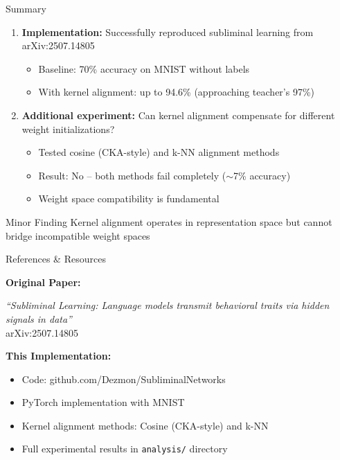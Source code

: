 \documentclass{beamer}
\begin{document}
\begin{frame}{Summary}

\begin{enumerate}
    \item \textbf{Implementation:} Successfully reproduced subliminal learning from arXiv:2507.14805
    \begin{itemize}
        \item Baseline: 70\% accuracy on MNIST without labels
        \item With kernel alignment: up to 94.6\% (approaching teacher's 97\%)
    \end{itemize}

    \vspace{0.5em}

    \item \textbf{Additional experiment:} Can kernel alignment compensate for different weight initializations?
    \begin{itemize}
        \item Tested cosine (CKA-style) and k-NN alignment methods
        \item \alert{Result: No} -- both methods fail completely ($\sim$7\% accuracy)
        \item Weight space compatibility is fundamental
    \end{itemize}
\end{enumerate}

\vspace{1em}

\begin{block}{Minor Finding}
Kernel alignment operates in representation space but cannot bridge incompatible weight spaces
\end{block}

\end{frame}

\begin{frame}{References \& Resources}

\textbf{Original Paper:}

\vspace{0.5em}

\small
\textit{``Subliminal Learning: Language models transmit behavioral traits via hidden signals in data''}\\
arXiv:2507.14805

\vspace{1.5em}

\normalsize
\textbf{This Implementation:}

\vspace{0.5em}

\begin{itemize}
    \item Code: github.com/Dezmon/SubliminalNetworks
    \item PyTorch implementation with MNIST
    \item Kernel alignment methods: Cosine (CKA-style) and k-NN
    \item Full experimental results in \texttt{analysis/} directory
\end{itemize}

\end{frame}
\end{document}
